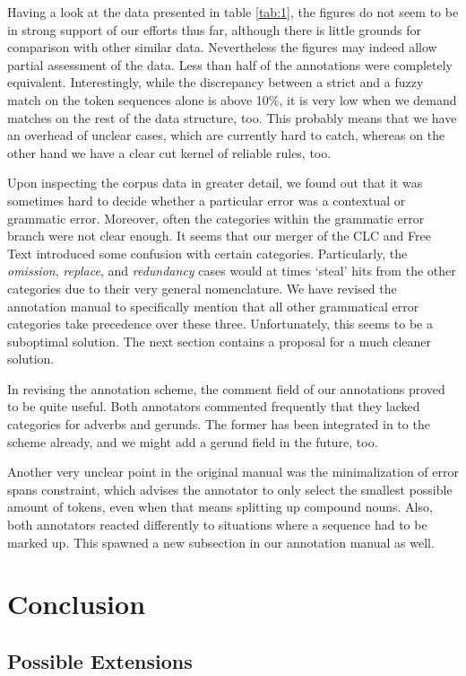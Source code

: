 \documentclass{article}
\begin{document}
Having a look at the data presented in table \ref{tab:1}, the figures do not
seem to be in strong support of our efforts thus far, although there is little
grounds for comparison with other similar data. Nevertheless the figures may
indeed allow partial assessment of the data.  Less than half of the annotations
were completely equivalent. Interestingly, while the discrepancy between a
strict and a fuzzy match on the token sequences alone is above 10\%, it is very
low when we demand matches on the rest of the data structure, too. This probably means
that we have an overhead of unclear cases, which are currently hard to catch,
whereas on the other hand we have a clear cut kernel of reliable rules, too.

Upon inspecting the corpus data in greater detail, we found out that it was
sometimes hard to decide whether a particular error was a contextual or
grammatic error. Moreover, often the categories within the grammatic error
branch were not clear enough. It seems that our merger of the CLC and Free Text
introduced some confusion with certain categories. Particularly, the
\textit{omission}, \textit{replace}, and \textit{redundancy} cases would at
times `steal' hits from the other categories due to their very general
nomenclature. We have revised the annotation manual to specifically mention that
all other grammatical error categories take precedence over these three.
Unfortunately, this seems to be a suboptimal solution. The next section contains
a proposal for a much cleaner solution.

In revising the annotation scheme, the comment field of our annotations proved
to be quite useful. Both annotators commented frequently that they lacked
categories for adverbs and gerunds. The former has been integrated in to the
scheme already, and we might add a gerund field in the future, too.

Another very unclear point in the original manual was the minimalization of
error spans constraint, which advises the annotator to only select the smallest
possible amount of tokens, even when that means splitting up compound nouns.
Also, both annotators reacted differently to situations where a sequence had to
be marked up. This spawned a new subsection in our annotation manual as well.

\section{Conclusion}

\subsection{Possible Extensions}
\end{document}
